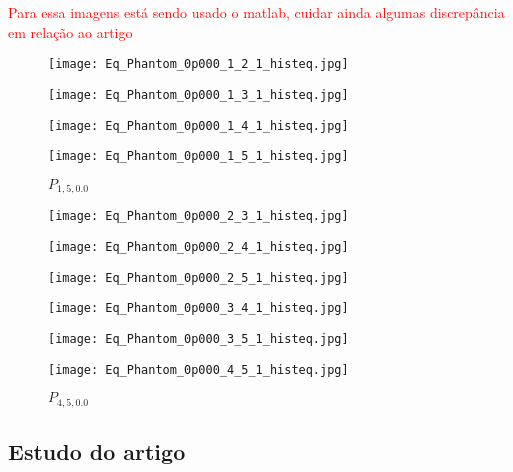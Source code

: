 \textcolor{red}{Para essa imagens está sendo usado o matlab, cuidar ainda algumas discrepância em relação ao artigo}

\begin{figure}[!htb]
  \texttt{[image: Eq\_Phantom\_0p000\_1\_2\_1\_histeq.jpg]}
	\caption{$P_{1,2,0.0}$}\label{fig:awesome_image1}
\endminipage\hfill
{}
  \texttt{[image: Eq\_Phantom\_0p000\_1\_3\_1\_histeq.jpg]}
	\caption{$P_{1,3,0.0}$}\label{fig:awesome_image1}
\endminipage\hfill
{}%
  \texttt{[image: Eq\_Phantom\_0p000\_1\_4\_1\_histeq.jpg]}
	\caption{ $P_{1,4,0.0}$}\label{fig:awesome_image1}
\endminipage
{}%
  \texttt{[image: Eq\_Phantom\_0p000\_1\_5\_1\_histeq.jpg]}
	\caption{ $P_{1,5,0.0}$}\label{fig:awesome_image1}
\endminipage
\end{figure}
\begin{figure}[!htb]
  \texttt{[image: Eq\_Phantom\_0p000\_2\_3\_1\_histeq.jpg]}
	\caption{$P_{2,3,0.0}$}\label{fig:awesome_image1}
\endminipage\hfill
{}
  \texttt{[image: Eq\_Phantom\_0p000\_2\_4\_1\_histeq.jpg]}
	\caption{$P_{2,4,0.0}$}\label{fig:awesome_image1}
\endminipage\hfill
{}%
  \texttt{[image: Eq\_Phantom\_0p000\_2\_5\_1\_histeq.jpg]}
	\caption{ $P_{2,5,0.0}$}\label{fig:awesome_image1}
\endminipage
{}%
  \texttt{[image: Eq\_Phantom\_0p000\_3\_4\_1\_histeq.jpg]}
	\caption{ $P_{3,4,0.0}$}\label{fig:awesome_image1}
\endminipage

  \texttt{[image: Eq\_Phantom\_0p000\_3\_5\_1\_histeq.jpg]}
	\caption{$P_{3,5,0.0}$}\label{fig:awesome_image1}
\endminipage\hfill
{}
  \texttt{[image: Eq\_Phantom\_0p000\_4\_5\_1\_histeq.jpg]}
	\caption{$P_{4,5,0.0}$}\label{fig:awesome_image1}
\endminipage\hfill
\end{figure}

\subsection{Estudo do artigo  \cite{nhfc}}

